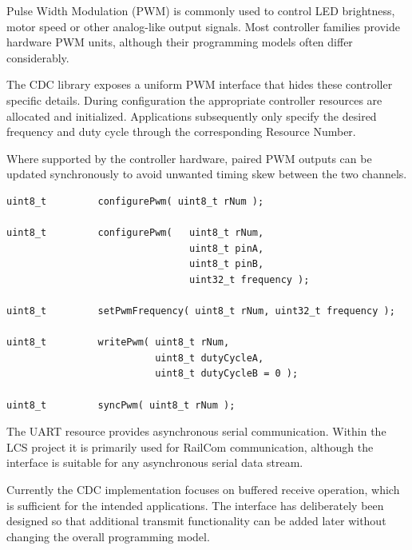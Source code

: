 
Pulse Width Modulation (PWM) is commonly used to control LED brightness, motor
speed or other analog-like output signals. Most controller families provide
hardware PWM units, although their programming models often differ considerably.

The CDC library exposes a uniform PWM interface that hides these controller
specific details. During configuration the appropriate controller resources are
allocated and initialized. Applications subsequently only specify the desired
frequency and duty cycle through the corresponding Resource Number.

Where supported by the controller hardware, paired PWM outputs can be updated
synchronously to avoid unwanted timing skew between the two channels.

\lstset{language=c++, style=api-interface}
\begin{lstlisting}
uint8_t         configurePwm( uint8_t rNum );

uint8_t         configurePwm(   uint8_t rNum, 
                                uint8_t pinA, 
                                uint8_t pinB, 
                                uint32_t frequency );
                                
uint8_t         setPwmFrequency( uint8_t rNum, uint32_t frequency );

uint8_t         writePwm( uint8_t rNum,
                          uint8_t dutyCycleA, 
                          uint8_t dutyCycleB = 0 ); 

uint8_t         syncPwm( uint8_t rNum );
\end{lstlisting}
\FloatBarrier


The UART resource provides asynchronous serial communication. Within the LCS
project it is primarily used for RailCom communication, although the interface
is suitable for any asynchronous serial data stream.

Currently the CDC implementation focuses on buffered receive operation, which is
sufficient for the intended applications. The interface has deliberately been
designed so that additional transmit functionality can be added later without
changing the overall programming model.

